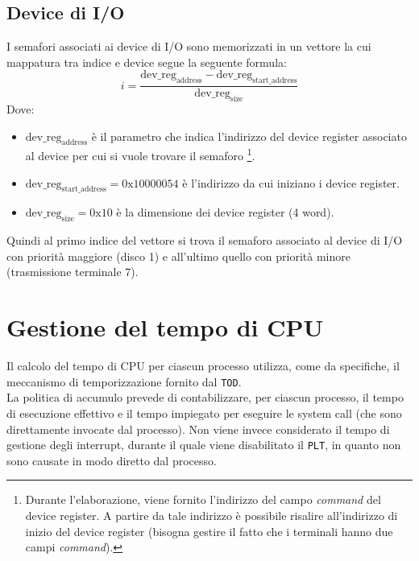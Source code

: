 \documentclass[11pt]{article}
\begin{document}
\subsection{Device di I/O}
I semafori associati ai device di I/O sono memorizzati in un vettore la cui mappatura tra indice e device segue la seguente formula:
\begin{equation}
    i = \dfrac{\text{dev\_reg}_{\text{address}} - \text{dev\_reg}_{\text{start\_address}}}{\text{dev\_reg}_{\text{size}}} 
\end{equation}
Dove:
\begin{itemize}
    \item $\text{dev\_reg}_{\text{address}}$ è il parametro che indica l'indirizzo del device register associato al device per cui si vuole trovare il semaforo
        \footnote{Durante l'elaborazione, viene fornito l'indirizzo del campo \textit{command} del device register. A partire da tale indirizzo è possibile risalire all'indirizzo di inizio del device register (bisogna gestire il fatto che i terminali hanno due campi \textit{command}).}.    
    \item $\text{dev\_reg}_{\text{start\_address}}=0\text{x}10000054$ è l'indirizzo da cui iniziano i device register.
    \item $\text{dev\_reg}_{\text{size}}=0\text{x}10$ è la dimensione dei device register (4 word).
\end{itemize}
Quindi al primo indice del vettore si trova il semaforo associato al device di I/O con priorità maggiore (disco 1) e all'ultimo quello con priorità minore (trasmissione terminale 7).


\section{Gestione del tempo di CPU}
Il calcolo del tempo di CPU per ciascun processo utilizza, come da specifiche, il meccanismo di temporizzazione fornito dal \texttt{TOD}.\\
La politica di accumulo prevede di contabilizzare, per ciascun processo, il tempo di esecuzione effettivo e il tempo impiegato per eseguire le system call (che sono direttamente invocate dal processo).
Non viene invece considerato il tempo di gestione degli interrupt, durante il quale viene disabilitato il \texttt{PLT}, in quanto non sono causate in modo diretto dal processo.

\newpage
\end{document}
